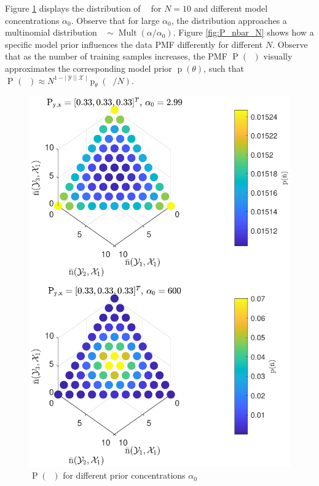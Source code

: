 \documentclass[12pt]{article}
\DeclareMathOperator{\nbarrm}{\bar{\mathrm{n}}}
\DeclareMathOperator{\Prm}{\mathrm{P}}
\DeclareMathOperator{\prm}{\mathrm{p}}
\DeclareMathOperator{\Xcal}{\mathcal{X}}
\DeclareMathOperator{\Ycal}{\mathcal{Y}}
\DeclareMathOperator{\Mult}{\mathrm{Mult}}
\begin{document}
Figure \ref{fig:P_nbar_a0} displays the distribution of $\nbarrm$ for $N=10$ and different model concentrations $\alpha_0$. Observe that for large $\alpha_0$, the distribution approaches a multinomial distribution $\nbarrm \sim \Mult(\alpha/\alpha_0)$. Figure \ref{fig:P_nbar_N} shows how a specific model prior influences the data PMF differently for different $N$. Observe that as the number of training samples increases, the PMF $\Prm(\nbarrm)$ visually approximates the corresponding model prior $\prm(\theta)$, such that $\Prm_{\nbarrm}(\nbarrm) \approx N^{1-|\Ycal||\Xcal|}\prm_{\theta}(\nbarrm/N)$.

\begin{figure}
\centering
\includegraphics[scale=1.0]{P_nbar_a0.pdf}
\caption{$\Prm(\nbarrm)$ for different prior concentrations $\alpha_0$}
\label{fig:P_nbar_a0}
\end{figure}
\end{document}
